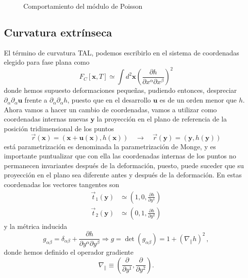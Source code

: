 \begin{figure}[h]
\centering
 \resizebox{\columnwidth}{!}{}
\caption{Comportamiento del módulo de Poisson}
\end{figure} 
\clearpage

\subsection{Curvatura extrínseca}

El término de curvatura TAL, podemos escribirlo en el sistema de coordenadas
elegido para fase plana como
\begin{equation}
F_C[\mathbf{x},T]\simeq\int d^2\mathbf{x} \left(\frac{\partial h}{\partial
  x^{\alpha} \partial x^{\beta}}\right)^2
\end{equation}
donde hemos supuesto deformaciones pequeñas, pudiendo entonces, despreciar
$\partial_{\alpha}\partial_{\alpha} \mathbf{u}$ frente a
$\partial_{\alpha}\partial_{\alpha} h$, puesto que en el desarrollo
$\mathbf{u}$ es de un orden menor que $h$. Ahora vamos a hacer un cambio de
coordenadas, vamos a utilizar como coordenadas internas nuevas $\mathbf{y}$ la proyección
en el plano de referencia de la posición tridimensional de los puntos
\begin{equation}
\vec{r}(\mathbf{x})=(\mathbf{x}+\mathbf{u(\mathbf{x})},h(\mathbf{x}))\quad
\rightarrow \quad \vec{r}(\mathbf{y})=(\mathbf{y},h(\mathbf{y}))
\end{equation}
está parametrización es denominada la parametrización de Monge, y es
importante puntualizar que con ella las coordenadas internas de los puntos no
permanecen invariantes después de la deformación, puesto, puede suceder que su
proyección en el plano sea diferente antes y después de la deformación. En
estas coordenadas los vectores tangentes son
\begin{align}
 \vec{t}_1(\mathbf{y})&\simeq\left(1,0,\frac{\partial h}{\partial y^1}\right)\\
 \vec{t}_2(\mathbf{y})&\simeq\left(0,1,\frac{\partial h}{\partial y^2}\right)
\end{align}
y la métrica inducida
\begin{equation}
g_{\alpha\beta}=\delta_{\alpha\beta}+\frac{\partial h}{\partial
  y^{\alpha} \partial y^{\beta}}\Rightarrow g=\det
(g_{\alpha\beta})=1+\left(\nabla_{\|} h\right)^2\, ,
\end{equation}
donde hemos definido el operador gradiente 
\begin{equation*}
\nabla_{\|}\equiv \left(\frac{\partial }{\partial y^1},\frac{\partial }{\partial y^2}\right).
\end{equation*}

